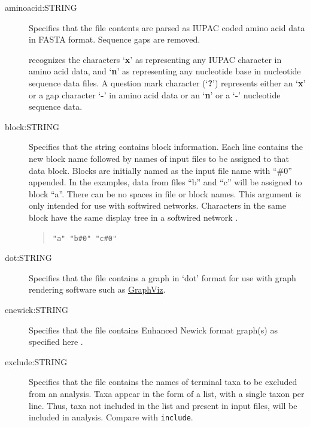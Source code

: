 	\begin{description}
		\item [aminoacid:STRING] Specifies that the file contents are parsed as IUPAC coded amino 
		acid data in FASTA \citep{PearsonandLipman1988} format.  Sequence gaps are removed.

		\begin{tcolorbox}[enhanced,fit to height=3cm,
  		colback=JungleGreen!40!black!2!white,colframe=JungleGreen!70!black,title=Note,
  		drop fuzzy shadow]
  		\phyg recognizes the characters `\textbf{x}' as representing any IUPAC character in amino
		acid data, and `\textbf{n}' as representing any nucleotide base in nucleotide sequence
		data files. A question mark character (`\textbf{?}') represents either an `\textbf{x}'  or a 
		gap character `\textbf{-}' in amino acid data or an `\textbf{n}' or a `\textbf{-}' nucleotide
		sequence data.
		\end{tcolorbox}

		\item [block:STRING] Specifies that the string contains block information. Each line contains 
		the new block name followed by names of input files to be assigned to that data block. 
		Blocks are initially named as the input file name with ``\#0'' appended. In the examples, 
		data from files ``b'' and ``c'' will be assigned to block ``a''. There can be no spaces in 
		file or block names. This argument is only intended for use with softwired networks.
		Characters in the same block have the same display tree in a softwired network
		\citep{WheelerandWashburn2023}.
			
			\begin{quote}
			\texttt{"a" "b\#0" "c\#0"}
			\end{quote}
	
		\item [dot:STRING] Specifies that the file contains a graph in `dot' format for use with graph 
		rendering software such as \href{https://en.wikipedia.org/wiki/Graphviz}{GraphViz}.
			
		\item [enewick:STRING] Specifies that the file contains Enhanced Newick format graph(s) as
		specified here \citep{Cardonaetal2008}. 
			
		\item [exclude:STRING] Specifies that the file contains the names of terminal taxa to be 
		excluded from an analysis. Taxa appear in the form of a list, with a single taxon per 
		line. Thus, taxa not included in the list and present in input files, will be included in 
		analysis. Compare with \texttt{include}.
			

\end{description}
